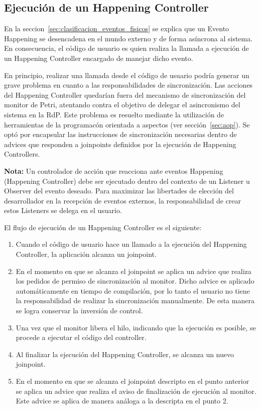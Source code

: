 \newpage

\subsection{Ejecución de un Happening Controller}
\label{sec:ejecucion_happening_controller}
En la seccion~\ref{sec:clasificacion_eventos_fisicos} se explica que un Evento
Happening se desencadena en el mundo externo y de forma asíncrona al sistema. 
En consecuencia, el código de usuario es quien realiza la llamada a ejecución
de un Happening Controller encargado de manejar dicho evento.

En principio, realizar una llamada desde el código de usuario podría generar un
grave problema en cuanto a las responsabilidades de sincronización. Las
acciones del Happening Controller quedarían fuera del mecanismo de
sincronización del monitor de Petri, atentando contra el objetivo de delegar
el asincronismo del sistema en la RdP.
Este problema es resuelto mediante la utilización de herramientas de la
programacón orientada a aspectos (ver sección~\ref{sec:aop}). Se optó por
encapsular las instrucciones de sincronización necesarias dentro de advices que
responden a joinpoints definidos por la ejecución de Happening Controllers.

\begin{framed}
\textbf{Nota:}
	Un controlador de acción que reacciona ante
	eventos Happening (Happening Controller) debe ser ejecutado dentro del
	contexto de un Listener u Observer del evento deseado.
	Para maximizar las libertades de elección del desarrollador en la recepción de
	eventos externos, la responsabilidad de crear estos Listeners se delega en el
	usuario.
\end{framed}


El flujo de ejecución de un Happening Controller es el siguiente:
\begin{enumerate}
  \item Cuando el código de usuario hace un llamado a la ejecución del Happening
  Controller, la aplicación alcanza un joinpoint.
  \item En el momento en que se alcanza el joinpoint se aplica un advice que
  realiza los pedidos de permiso de sincronización al monitor. Dicho advice es
  aplicado automáticamente en tiempo de compilación, por lo tanto el usuario no
  tiene la responsabilidad de realizar la sincronización manualmente. De esta
  manera se logra conservar la inversión de control.
  \item Una vez que el monitor libera el hilo, indicando que la ejecución es
  posible, se procede a ejecutar el código del controller.
  \item Al finalizar la ejecución del Happening Controller, se alcanza un nuevo
  joinpoint.
  \item En el momento en que se alcanza el joinpoint descripto en el punto
  anterior se aplica un advice que realiza el aviso de finalización de
  ejecución al monitor. Este advice se aplica de manera análoga a la descripta
  en el punto 2.
\end{enumerate}

